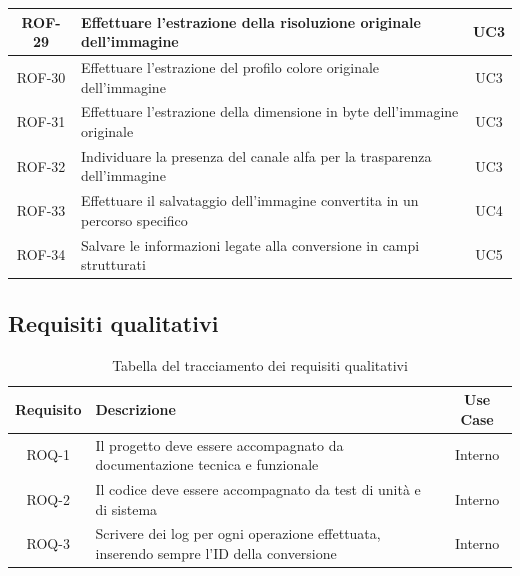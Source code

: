 \begin{table}[H]
\begin{tabularx}{\textwidth}{|c|X|c|}
        ROF-29                          & Effettuare l'estrazione della risoluzione originale dell'immagine
                                        & UC3
        \\
        \hline
        ROF-30                          & Effettuare l'estrazione del profilo colore originale dell'immagine
                                        & UC3
        \\
        \hline
        ROF-31                          & Effettuare l'estrazione della dimensione in byte
        dell'immagine originale
                                        & UC3
        \\
        \hline
        ROF-32                          & Individuare la presenza del canale alfa per la
        trasparenza dell'immagine
                                        & UC3
        \\
        \hline
        ROF-33                          & Effettuare il salvataggio dell'immagine convertita
        in un percorso specifico
                                        & UC4
        \\
        \hline

        ROF-34                          & Salvare le informazioni legate alla conversione in
        campi strutturati               & UC5
        \\
        \hline
    \end{tabularx}
\end{table}
\subsection{Requisiti qualitativi}
\begin{table}[H]
    \caption{Tabella del tracciamento dei requisiti qualitativi}
    \label{tab:requisiti-qualitativi}
    \begin{tabularx}{\textwidth}{|c|X|c|}
        \hline
        \textbf{Requisito}                  & \textbf{Descrizione}                    & \textbf{Use Case} \\
        \hline
        ROQ-1                               & Il progetto deve essere accompagnato da
        documentazione tecnica e funzionale & Interno                                                     \\
        \hline
        ROQ-2                               & Il codice deve essere accompagnato
        da test di unità e di sistema       & Interno
        \\
        \hline
        ROQ-3                               & Scrivere dei log per ogni
        operazione effettuata, inserendo sempre l'ID della conversione
                                            & Interno
        \\
        \hline
    \end{tabularx}
\end{table}

